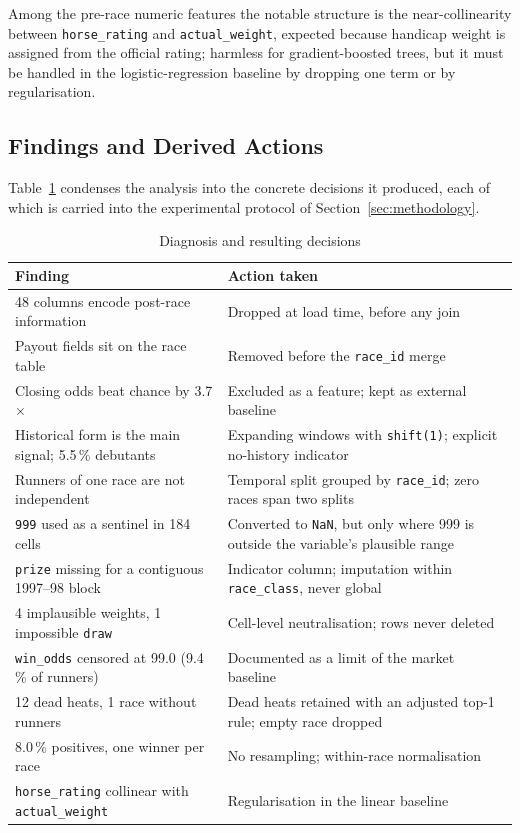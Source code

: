 Among the pre-race numeric
features the notable structure is the near-collinearity between
\texttt{horse\_rating} and \texttt{actual\_weight}, expected because
handicap weight is assigned from the official rating; harmless for
gradient-boosted trees, but it must be handled in the logistic-regression
baseline by dropping one term or by regularisation.

\subsection{Findings and Derived Actions}
\label{sec:actions}

Table~\ref{tab:acciones} condenses the analysis into the concrete
decisions it produced, each of which is carried into the experimental
protocol of Section~\ref{sec:methodology}.

\begin{table}[!t]
\centering
\caption{Diagnosis and resulting decisions}
\label{tab:acciones}
\scriptsize
\renewcommand{\arraystretch}{1.2}
\begin{tabular}{@{}p{3.4cm} p{4.2cm}@{}}
\toprule
\textbf{Finding} & \textbf{Action taken} \\
\midrule
48 columns encode post-race information &
Dropped at load time, before any join \\
Payout fields sit on the race table &
Removed before the \texttt{race\_id} merge \\
Closing odds beat chance by 3.7$\times$ &
Excluded as a feature; kept as external baseline \\
Historical form is the main signal; 5.5\,\% debutants &
Expanding windows with \texttt{shift(1)}; explicit no-history indicator \\
Runners of one race are not independent &
Temporal split grouped by \texttt{race\_id}; zero races span two splits \\
\texttt{999} used as a sentinel in 184 cells &
Converted to \texttt{NaN}, but only where 999 is outside the variable's plausible range \\
\texttt{prize} missing for a contiguous 1997--98 block &
Indicator column; imputation within \texttt{race\_class}, never global \\
4 implausible weights, 1 impossible \texttt{draw} &
Cell-level neutralisation; rows never deleted \\
\texttt{win\_odds} censored at 99.0 (9.4\,\% of runners) &
Documented as a limit of the market baseline \\
12 dead heats, 1 race without runners &
Dead heats retained with an adjusted top-1 rule; empty race dropped \\
8.0\,\% positives, one winner per race &
No resampling; within-race normalisation \\
\texttt{horse\_rating} collinear with \texttt{actual\_weight} &
Regularisation in the linear baseline \\
\bottomrule
\end{tabular}
\end{table}